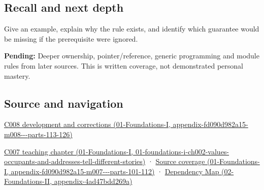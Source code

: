 \subsection{Recall and next depth}\label{appendix-f1581457d322-recall-and-next-depth}

Give an example, explain why the rule exists, and identify which guarantee would be missing if the prerequisite were ignored.

\textbf{Pending:} Deeper ownership, pointer/reference, generic programming and module rules from later sources. This is written coverage, not demonstrated personal mastery.

\subsection{Source and navigation}\label{appendix-f1581457d322-source-and-navigation}

\href{../01-Foundations-I/main.pdf\#nameddest=appendix-fd090d982a15-m008---parts-113-126}{C008 development and corrections (01-Foundations-I, appendix-fd090d982a15-m008-\/-\/-parts-113-126)}

\href{../01-Foundations-I/main.pdf\#nameddest=01-foundations-i-ch002-values-occupants-and-addresses-tell-different-stories}{C007 teaching chapter (01-Foundations-I, 01-foundations-i-ch002-values-occupants-and-addresses-tell-different-stories)} · \href{../01-Foundations-I/main.pdf\#nameddest=appendix-fd090d982a15-m007---parts-101-112}{Source coverage (01-Foundations-I, appendix-fd090d982a15-m007-\/-\/-parts-101-112)} · \href{../02-Foundations-II/main.pdf\#nameddest=appendix-4ad47bdd269a}{Dependency Map (02-Foundations-II, appendix-4ad47bdd269a)}
